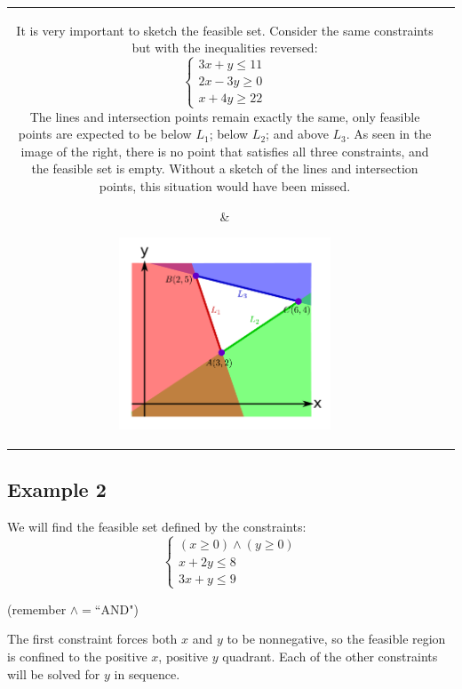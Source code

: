 \documentclass{article}
\begin{document}
\begin{tabular}{cc}
\parbox{0.5\textwidth}{
It is very important to sketch the feasible set. Consider the same constraints but with the inequalities reversed:
\[\left\{\begin{array}{c} 
3x + y \leq 11 \\
2x - 3y \geq 0 \\
x + 4y \geq 22
\end{array}\right.\]
The lines and intersection points remain exactly the same, only feasible points are expected to be below \(L_1\); below \(L_2\); and above \(L_3\). As seen in the image of the right, there is no point that satisfies all three constraints, and the feasible set is empty. Without a sketch of the lines and intersection points, this situation would have been missed.
} & \parbox{0.5\textwidth}{
\includegraphics[width = 0.5\textwidth]{feasible_set_1x}
}
\end{tabular}



\subsection*{Example 2}

We will find the feasible set defined by the constraints:
\[\left\{\begin{array}{c} 
(x \geq 0) \wedge (y \geq 0) \\
x + 2y \leq 8 \\
3x + y \leq 9
\end{array}\right.\]

(remember \(\wedge = \text{``AND"}\))

The first constraint forces both \(x\) and \(y\) to be nonnegative, so the feasible region is confined to the positive \(x\), positive \(y\) quadrant. Each of the other constraints will be solved for \(y\) in sequence.

\vspace{5mm}
\end{document}
